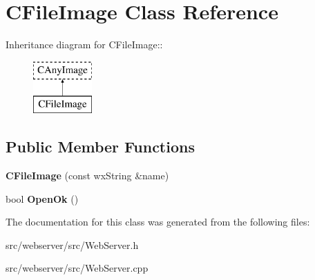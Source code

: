 \section{CFileImage Class Reference}
\label{classCFileImage}
Inheritance diagram for CFileImage::\begin{figure}[H]
\begin{center}
\leavevmode
\includegraphics[height=2cm]{classCFileImage}
\end{center}
\end{figure}
\subsection*{Public Member Functions}
\begin{DoxyCompactItemize}
\item 
{\bfseries CFileImage} (const wxString \&name)\label{classCFileImage_a8ee0d8febe77af40f25dc3f5db77c17d}

\item 
bool {\bfseries OpenOk} ()\label{classCFileImage_a5016f2bbda00f09bb58d2c2ea7944fda}

\end{DoxyCompactItemize}


The documentation for this class was generated from the following files:\begin{DoxyCompactItemize}
\item 
src/webserver/src/WebServer.h\item 
src/webserver/src/WebServer.cpp\end{DoxyCompactItemize}
